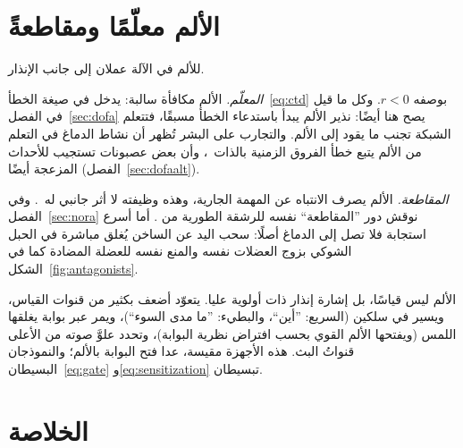 \section{الألم معلّمًا ومقاطعةً}

للألم في الآلة عملان إلى جانب الإنذار.

\emph{المعلّم.} الألم مكافأة سالبة: يدخل في صيغة الخطأ~\eqref{eq:ctd} بوصفه $r<0$. وكل ما قيل في الفصل~\ref{sec:dofa} يصح هنا أيضًا: نذير الألم يبدأ باستدعاء الخطأ مسبقًا، فتتعلم الشبكة تجنب ما يقود إلى الألم. والتجارب على البشر تُظهر أن نشاط الدماغ في التعلم من الألم يتبع خطأ الفروق الزمنية بالذات~\cite{Seymour2004}، وأن بعض عصبونات  تستجيب للأحداث المزعجة أيضًا (الفصل~\ref{sec:dofaalt}).

\emph{المقاطعة.} الألم يصرف الانتباه عن المهمة الجارية، وهذه وظيفته لا أثر جانبي له~\cite{EcclestonCrombez1999}. وفي الفصل~\ref{sec:nora} نوقش دور ”المقاطعة“ نفسه للرشقة الطورية من . أما أسرع استجابة فلا تصل إلى الدماغ أصلًا: سحب اليد عن الساخن يُغلق مباشرة في الحبل الشوكي بزوج العضلات نفسه والمنع نفسه للعضلة المضادة كما في الشكل~\ref{fig:antagonists}.

\begin{keyblock}
\begin{proposition}
\label{prop:pain}
الألم ليس قياسًا، بل إشارة إنذار ذات أولوية عليا. يتعوّد أضعف بكثير من قنوات القياس، ويسير في سلكين (السريع: ”أين“، والبطيء: ”ما مدى السوء“)، ويمر عبر بوابة يغلقها اللمس (ويفتحها الألم القوي بحسب افتراض نظرية البوابة)، وتحدد علوَّ صوته من الأعلى قنواتُ البث. هذه الأجهزة مقيسة، عدا فتح البوابة بالألم؛ والنموذجان البسيطان~\eqref{eq:gate} و\eqref{eq:sensitization} تبسيطان.
\end{proposition}
\end{keyblock}

\section{الخلاصة}

